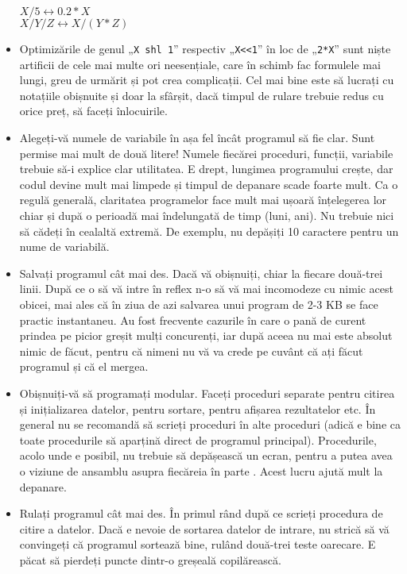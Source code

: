 \begin{itemize}
  $X/5 \leftrightarrow 0.2*X$\\
  $X/Y/Z \leftrightarrow X/(Y*Z)$

\item Optimizările de genul „{\tt X shl 1}” respectiv „{\tt X<<1}” în loc de
  „{\tt 2*X}” sunt niște artificii de cele mai multe ori neesențiale, care în
  schimb fac formulele mai lungi, greu de urmărit și pot crea complicații. Cel
  mai bine este să lucrați cu notațiile obișnuite și doar la sfârșit, dacă
  timpul de rulare trebuie redus cu orice preț, să faceți înlocuirile.

\item Alegeți-vă numele de variabile în așa fel încât programul să fie
  clar. Sunt permise mai mult de două litere! Numele fiecărei proceduri,
  funcții, variabile trebuie să-i explice clar utilitatea. E drept, lungimea
  programului crește, dar codul devine mult mai limpede și timpul de depanare
  scade foarte mult. Ca o regulă generală, claritatea programelor face mult
  mai ușoară înțelegerea lor chiar și după o perioadă mai îndelungată de timp
  (luni, ani). Nu trebuie nici să cădeți în cealaltă extremă. De exemplu, nu
  depășiți 10 caractere pentru un nume de variabilă.
  
\item Salvați programul cât mai des. Dacă vă obișnuiți, chiar la fiecare
  două-trei linii. După ce o să vă intre în reflex n-o să vă mai incomodeze cu
  nimic acest obicei, mai ales că în ziua de azi salvarea unui program de 2-3
  KB se face practic instantaneu. Au fost frecvente cazurile în care o pană de
  curent prindea pe picior greșit mulți concurenți, iar după aceea nu mai este
  absolut nimic de făcut, pentru că nimeni nu vă va crede pe cuvânt că ați
  făcut programul și că el mergea.
  
\item Obișnuiți-vă să programați modular. Faceți proceduri separate pentru
  citirea și inițializarea datelor, pentru sortare, pentru afișarea
  rezultatelor etc. În general nu se recomandă să scrieți proceduri în alte
  proceduri (adică e bine ca toate procedurile să aparțină direct de programul
  principal). Procedurile, acolo unde e posibil, nu trebuie să depășească un
  ecran, pentru a putea avea o viziune de ansamblu asupra fiecăreia în parte
  . Acest lucru ajută mult la depanare.
  
\item Rulați programul cât mai des. În primul rând după ce scrieți procedura
  de citire a datelor. Dacă e nevoie de sortarea datelor de intrare, nu strică
  să vă convingeți că programul sortează bine, rulând două-trei teste
  oarecare. E păcat să pierdeți puncte dintr-o greșeală copilărească.
  

\end{itemize}
